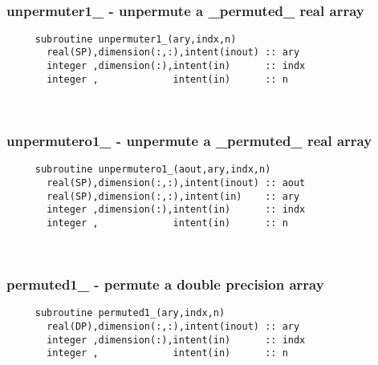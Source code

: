  
\mbox{}\hrulefill\ 

  \subsubsection{unpermuter1\_ - unpermute a \_permuted\_ real array}

\begin{verbatim} 
     subroutine unpermuter1_(ary,indx,n)
       real(SP),dimension(:,:),intent(inout) :: ary
       integer ,dimension(:),intent(in)      :: indx
       integer ,             intent(in)      :: n
 \end{verbatim}%
 
 
\mbox{}\hrulefill\ 
 

  \subsubsection{unpermutero1\_ - unpermute a \_permuted\_ real array}

\begin{verbatim} 
     subroutine unpermutero1_(aout,ary,indx,n)
       real(SP),dimension(:,:),intent(inout) :: aout
       real(SP),dimension(:,:),intent(in)    :: ary
       integer ,dimension(:),intent(in)      :: indx
       integer ,             intent(in)      :: n
 \end{verbatim}%
 
 
\mbox{}\hrulefill\ 
 

  \subsubsection{permuted1\_ - permute a double precision array}

\begin{verbatim} 
     subroutine permuted1_(ary,indx,n)
       real(DP),dimension(:,:),intent(inout) :: ary
       integer ,dimension(:),intent(in)      :: indx
       integer ,             intent(in)      :: n
 \end{verbatim}%
 
